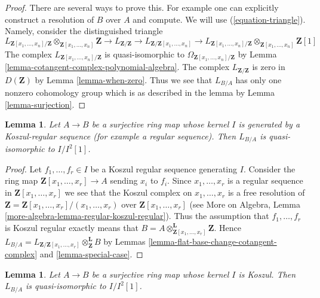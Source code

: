 \documentclass{stacks-project}
\theoremstyle{plain}
\newtheorem{lemma}[subsection]{Lemma}
\theoremstyle{definition}
\theoremstyle{remark}
\numberwithin{equation}{subsection}
\begin{document}
\begin{proof}
There are several ways to prove this. For example one can explicitly construct
a resolution of $B$ over $A$ and compute. We will use (\ref{equation-triangle}).
Namely, consider the distinguished triangle
$$
L_{\mathbf{Z}[x_1, \ldots, x_n]/\mathbf{Z}}
\otimes_{\mathbf{Z}[x_1, \ldots, x_n]} \mathbf{Z} \to
L_{\mathbf{Z}/\mathbf{Z}} \to
L_{\mathbf{Z}/\mathbf{Z}[x_1, \ldots, x_n]}\to
L_{\mathbf{Z}[x_1, \ldots, x_n]/\mathbf{Z}}
\otimes_{\mathbf{Z}[x_1, \ldots, x_n]} \mathbf{Z}[1]
$$
The complex $L_{\mathbf{Z}[x_1, \ldots, x_n]/\mathbf{Z}}$
is quasi-isomorphic to $\Omega_{\mathbf{Z}[x_1, \ldots, x_n]/\mathbf{Z}}$ by
Lemma \ref{lemma-cotangent-complex-polynomial-algebra}.
The complex $L_{\mathbf{Z}/\mathbf{Z}}$ is zero in $D(\mathbf{Z})$ by
Lemma \ref{lemma-when-zero}.
Thus we see that $L_{B/A}$ has only one nonzero cohomology group
which is as described in the lemma by Lemma \ref{lemma-surjection}.
\end{proof}

\begin{lemma}
\label{lemma-mod-regular-sequence}
Let $A \to B$ be a surjective ring map whose kernel $I$ is generated
by a Koszul-regular sequence (for example a regular sequence).
Then $L_{B/A}$ is quasi-isomorphic to $I/I^2[1]$.
\end{lemma}

\begin{proof}
Let $f_1, \ldots, f_r \in I$ be a Koszul regular sequence generating $I$.
Consider the ring map $\mathbf{Z}[x_1, \ldots, x_r] \to A$ sending
$x_i$ to $f_i$. Since $x_1, \ldots, x_r$ is a regular sequence in
$\mathbf{Z}[x_1, \ldots, x_r]$ we see that the Koszul complex
on $x_1, \ldots, x_r$ is a free resolution of
$\mathbf{Z} = \mathbf{Z}[x_1, \ldots, x_r]/(x_1, \ldots, x_r)$
over $\mathbf{Z}[x_1, \ldots, x_r]$
(see More on Algebra, Lemma \ref{more-algebra-lemma-regular-koszul-regular}).
Thus the assumption that $f_1, \ldots, f_r$ is Koszul regular
exactly means that
$B = A \otimes_{\mathbf{Z}[x_1, \ldots, x_r]}^\mathbf{L} \mathbf{Z}$.
Hence
$L_{B/A} = L_{\mathbf{Z}/\mathbf{Z}[x_1, \ldots, x_r]}
\otimes_\mathbf{Z}^\mathbf{L} B$ by
Lemmas \ref{lemma-flat-base-change-cotangent-complex} and
\ref{lemma-special-case}.
\end{proof}

\begin{lemma}
\label{lemma-mod-Koszul-regular-ideal}
Let $A \to B$ be a surjective ring map whose kernel $I$ is Koszul.
Then $L_{B/A}$ is quasi-isomorphic to $I/I^2[1]$.
\end{lemma}
\end{document}
